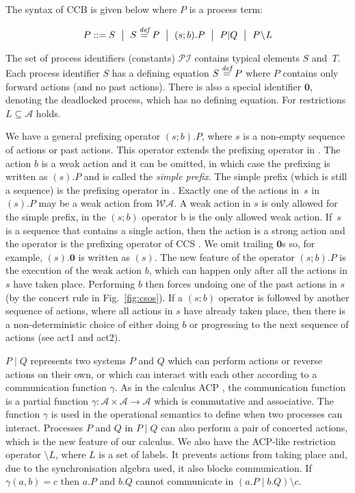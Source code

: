 \documentclass[runningheads]{llncs}
\newcommand{\restrict}[1]{\!\setminus\!#1}
\newcommand{\paral}{\; \vert \;}
\newcommand{\mA}{\mathcal{A}}
\newcommand{\mWA}{\mathcal{WA}}
\newcommand{\PI}{\mathcal{PI}}
\newcommand{\Nil}{\mathbf{0}}
\newcommand{\bydef}{\stackrel{\emph{def}}{=}}
\newcommand{\rulename}[1]{\textsf{#1}}
\begin{document}
The syntax of CCB is given below where $P$ is a process term:

$$P ::=  S \ \bigm\lvert \ S\bydef P \ \bigm\lvert \ (s;b).P \ \bigm\lvert \ P\lvert Q \ \bigm\lvert \ P\restrict L $$

The set of process identifiers (constants) $\PI$ contains typical elements $S$ and~$T$. 
Each process identifier $S$ has a defining equation $S\bydef P$ where $P$ contains only forward 
actions (and no past actions). There is also a special identifier
 $\Nil$, denoting the deadlocked process, which has no defining equation. For restrictions $L \subseteq \mA$ holds.
 
We have a general prefixing operator
$(s;b).P$, where $s$ is a non-empty sequence of actions or past actions. This operator
extends the prefixing operator in \cite{Irek2012}. The action $b$ is a weak action
and it can be omitted, in which case the prefixing is written as $(s).P$ and is called the
\emph{simple prefix}. The simple prefix (which is still a sequence) is the prefixing operator in \cite{Irek2012}. 
Exactly one of the actions in~$s$ in $(s).P$ may be a weak action from $\mWA$. A weak action in $s$ is only allowed for the simple prefix, in the $(s;b)$ operator b is the only allowed weak action. If~$s$ is a sequence that contains   
a single action, then the action is a strong action and the operator 
is the prefixing operator of CCS \cite{Milner1980}.
We omit trailing $\Nil$s so, for example, $(s).\Nil$ is written as $(s)$. The new feature of the operator $(s;b).P$ is the execution of the weak action $b$, which
can happen only after all the actions in $s$ have taken place. Performing $b$ then forces
undoing one of the past actions in $s$ (by the \rulename{concert} rule in Fig.~\ref{fig:csos}). 
If a $(s;b)$ operator is followed by another sequence of actions, where all actions in $s$ have already taken place, then there is a non-deterministic choice of either doing $b$ or progressing 
to the next sequence of actions (see \rulename{act1} and \rulename{act2}).

$P\paral Q$ represents two systems $P$ and $Q$ which can perform actions or reverse actions on
their own, or which can interact with each other according to a communication function
$\gamma$. As in the calculus ACP \cite{ACPBook}, the communication function is a partial function 
$\gamma: \mathcal A \times \mathcal A \rightarrow \mathcal A$ which is commutative and associative. The function
$\gamma$ is used in the operational semantics to define when two processes can interact. Processes 
$P$ and $Q$ in $P\paral Q$ can also perform a pair of concerted actions,
which is the new feature of our calculus.  We also have the ACP-like restriction operator 
$\setminus L$, where $L$ is a set of labels. It prevents actions from taking place and, due to 
the synchronisation algebra used, it also blocks communication. If $\gamma(a,b)=c$ then $a.P$ and $b.Q$
cannot communicate in $(a.P\paral b.Q)\setminus c$.
\end{document}
